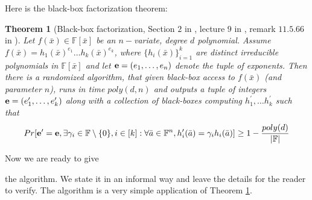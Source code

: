 \documentclass[12pt]{caltech_thesis}
\theoremstyle{plain}
\newtheorem{theorem}{Theorem}
\theoremstyle{definition}
\renewcommand{\bf}{\textbf}
\newcommand{\F}{\mathbb{F}}
\newcommand{\B}[1]{\bar{#1}}
\begin{document}
Here is the black-box factorization theorem:


\begin{theorem}[Black-box factorization, Section $2$ in \cite{KalTr90}, lecture $9$ in \cite{Sud98}, remark $11.5.66$ in \cite{MulPa13}]\label{theorem:blackboxfactors}
 Let $f(\B{x})\in \F[\B{x}]$ be an $n-$variate, degree $d$ polynomial. Assume $f(\B{x}) = h_1(\B{x})^{e_1}\ldots h_k(\B{x})^{e_k}$,
 where $\{h_i(\B{x})\}_{i=1}^k$ are distinct irreducible polynomials in $\F[\B{x}]$ and let ${\bf e} = (e_1,\ldots,e_n)$ denote the tuple of exponents.
 Then there is a randomized algorithm, that given black-box access to $f(\B{x})$ (and parameter $n$), runs in
 time $poly(d,n)$ and outputs a tuple of integers ${\bf e }=(e_1^\prime,\ldots,e_k^\prime)$ along with a collection
 of black-boxes computing $h_1^\prime,\ldots h_k^\prime$ such that
 \[
  Pr[ {\bf e^\prime} = {\bf e }, \exists \gamma_i\in \F\setminus \{0\}, i\in [k]: \forall \B{a}\in \F^n, h_i^\prime(\B{a})= \gamma_i h_i(\B{a}) ]\geq 1-\frac{poly(d)}{|\F|}
 \]

\end{theorem}

Now we are ready to give %
\begin{publishedcontent}%
\cite{Sin16}\printbibliography
\end{publishedcontent}the algorithm. We state it in an informal way and leave the details for the reader to verify. The algorithm is a very
simple application of Theorem \ref{theorem:blackboxfactors}.
\end{document}
